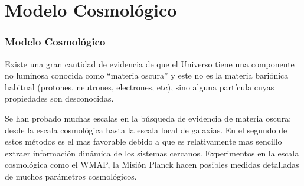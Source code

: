 \documentclass{beamer}
\begin{document}
%		

\section{Modelo Cosmológico}
	\begin{frame}
		\frametitle{Modelo Cosmológico}
		Existe una gran cantidad de evidencia de que el Universo tiene una componente no luminosa conocida como ``materia oscura'' y este no es la materia bariónica habitual (protones, neutrones, electrones, etc), sino alguna partícula cuyas propiedades son desconocidas.

Se han probado muchas escalas en la búsqueda de evidencia de materia oscura: desde la escala cosmológica hasta la escala local de galaxias. En el segundo de estos métodos es el mas favorable debido a que es relativamente mas sencillo extraer información dinámica de los sistemas cercanos. Experimentos en la escala cosmológica como el WMAP, la Misión Planck hacen posibles medidas detalladas de muchos parámetros cosmológicos.

	\end{frame}
\end{document}

